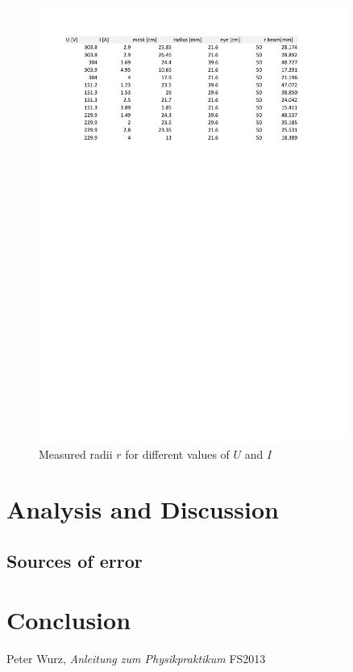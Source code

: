 \documentclass{scrreprt}
\begin{document}
\begin{figure}[H]
	\centering
  \includegraphics[width=0.9\textwidth]{diag/measurements.pdf}
	\caption{Measured radii $r$ for different values of $U$ and $I$}
	\label{fig:measurements}
\end{figure}

\section{Analysis and Discussion}

\subsection{Sources of error}
\label{sec:error}

\section{Conclusion}

\begin{thebibliography}{9}

  Peter Wurz,
  \emph{Anleitung zum Physikpraktikum}
  FS2013

\end{thebibliography}
\end{document}
